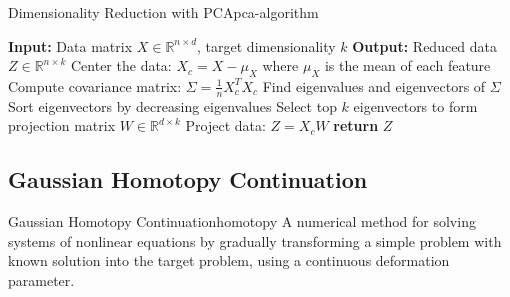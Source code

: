 \documentclass[12pt]{article}
\begin{document}
\begin{algorithmenv}{Dimensionality Reduction with PCA}{pca-algorithm}
\begin{algorithmic}[1]
\State \textbf{Input:} Data matrix $X \in \mathbb{R}^{n \times d}$, target dimensionality $k$
\State \textbf{Output:} Reduced data $Z \in \mathbb{R}^{n \times k}$
\State Center the data: $X_c = X - \mu_X$ where $\mu_X$ is the mean of each feature
\State Compute covariance matrix: $\Sigma = \frac{1}{n}X_c^T X_c$
\State Find eigenvalues and eigenvectors of $\Sigma$
\State Sort eigenvectors by decreasing eigenvalues
\State Select top $k$ eigenvectors to form projection matrix $W \in \mathbb{R}^{d \times k}$
\State Project data: $Z = X_c W$
\State \textbf{return} $Z$
\end{algorithmic}
\end{algorithmenv}


\subsection{Gaussian Homotopy Continuation}

\begin{definition}{Gaussian Homotopy Continuation}{homotopy}
A numerical method for solving systems of nonlinear equations by gradually transforming a simple problem with known solution into the target problem, using a continuous deformation parameter.
\end{definition}
\end{document}
